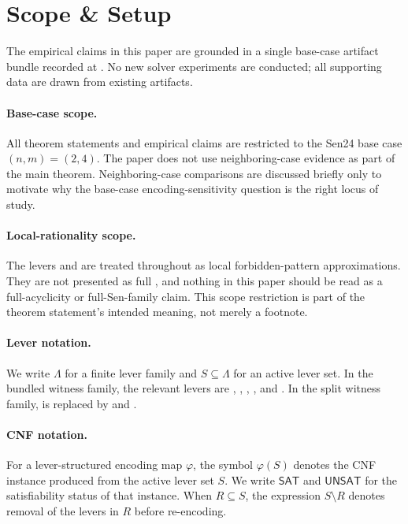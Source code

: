 \section{Scope \& Setup}
\label{sec:scope}

The empirical claims in this paper are grounded in a single base-case artifact bundle recorded at
.
No new solver experiments are conducted; all supporting data are drawn from existing artifacts.

\paragraph{Base-case scope.}
All theorem statements and empirical claims are restricted to the Sen24 base case \((n,m)=(2,4)\).
The paper does not use neighboring-case evidence as part of the main theorem.
Neighboring-case comparisons are discussed briefly only to motivate why the base-case encoding-sensitivity question is the right locus of study.

\paragraph{Local-rationality scope.}
The levers  and  are treated throughout as local forbidden-pattern approximations.
They are not presented as full , and nothing in this paper should be read as a full-acyclicity or full-Sen-family claim.
This scope restriction is part of the theorem statement's intended meaning, not merely a footnote.

\paragraph{Lever notation.}
We write \(\Lambda\) for a finite lever family and \(S \subseteq \Lambda\) for an active lever set.
In the bundled witness family, the relevant levers are , , , , and .
In the split witness family,  is replaced by  and .

\paragraph{CNF notation.}
For a lever-structured encoding map \(\varphi\), the symbol \(\varphi(S)\) denotes the CNF instance produced from the active lever set \(S\).
We write \(\mathsf{SAT}\) and \(\mathsf{UNSAT}\) for the satisfiability status of that instance.
When \(R \subseteq S\), the expression \(S \setminus R\) denotes removal of the levers in \(R\) before re-encoding.

